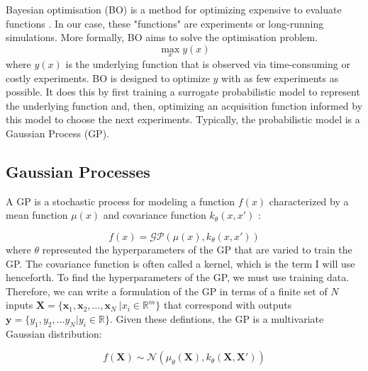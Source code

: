 Bayesian optimisation (BO) is a method for optimizing expensive to evaluate functions \cite{Shahriari2016}. In our case, these "functions" are experiments or long-running simulations. More formally, BO aims to solve the optimisation problem.
\begin{equation}
    \max_x y(x)
\end{equation}
where $y(x)$ is the underlying function that is observed via time-consuming or costly experiments. BO is designed to optimize $y$ with as few experiments as possible. It does this by first training a surrogate probabilistic model to represent the underlying function and, then, optimizing an acquisition function informed by this model to choose the next experiments. Typically, the probabilistic model is a Gaussian Process (GP). 

\subsection{Gaussian Processes}

A GP is a stochastic process for modeling a function $f(x)$ characterized by a mean function $\mu(x)$ and covariance function $k_{\theta}(x,x')$ \cite{Rasmussen2006}:

\begin{equation}
    f(x)= \mathcal{GP}(\mu(x), k_{\theta}(x, x'))
\end{equation}
where $\theta$ represented the hyperparameters of the GP that are varied to train the GP. The covariance function is often called a kernel, which is the term I will use henceforth. To find the hyperparameters of the GP, we must use training data. Therefore, we can write a formulation of the GP in terms of a finite set of $N$ inputs $\mathbf X = \{\mathbf x_1, \mathbf x_2, \dots, \mathbf x_N \ \vert x_i \in \mathbb R^m \}$ that correspond with outputs $\mathbf y = \{y_1, y_2, \dots y_N \vert  y_i \in \mathbb R \}$. Given these defintions, the GP is a multivariate Gaussian distribution:

\begin{equation}
    f(\mathbf X) \sim \mathcal N(\mu_{\theta}(\mathbf X), k_{\theta}(\mathbf X, \mathbf X'))
\end{equation}

